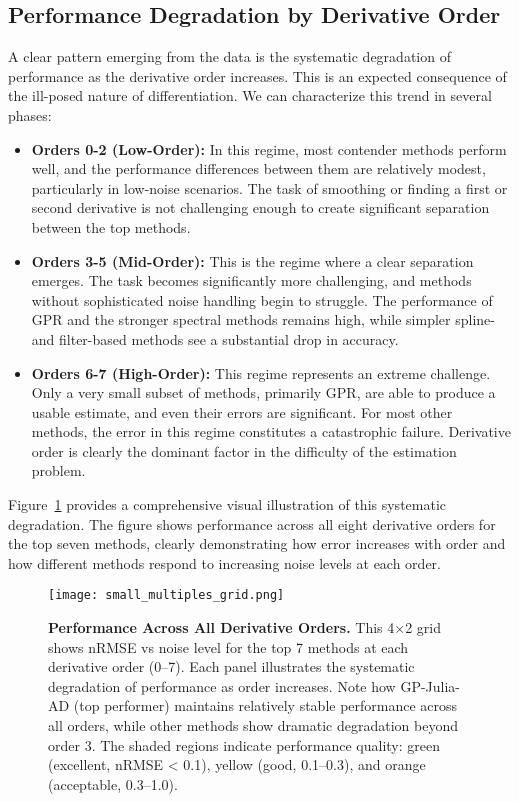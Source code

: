 \subsection{Performance Degradation by Derivative Order}
A clear pattern emerging from the data is the systematic degradation of performance as the derivative order increases. This is an expected consequence of the ill-posed nature of differentiation. We can characterize this trend in several phases:
\begin{itemize}
    \item \textbf{Orders 0-2 (Low-Order):} In this regime, most contender methods perform well, and the performance differences between them are relatively modest, particularly in low-noise scenarios. The task of smoothing or finding a first or second derivative is not challenging enough to create significant separation between the top methods.
    \item \textbf{Orders 3-5 (Mid-Order):} This is the regime where a clear separation emerges. The task becomes significantly more challenging, and methods without sophisticated noise handling begin to struggle. The performance of GPR and the stronger spectral methods remains high, while simpler spline- and filter-based methods see a substantial drop in accuracy.
    \item \textbf{Orders 6-7 (High-Order):} This regime represents an extreme challenge. Only a very small subset of methods, primarily GPR, are able to produce a usable estimate, and even their errors are significant. For most other methods, the error in this regime constitutes a catastrophic failure. Derivative order is clearly the dominant factor in the difficulty of the estimation problem.
\end{itemize}

Figure~\ref{fig:small_multiples} provides a comprehensive visual illustration of this systematic degradation. The figure shows performance across all eight derivative orders for the top seven methods, clearly demonstrating how error increases with order and how different methods respond to increasing noise levels at each order.

\begin{figure}[htbp]
\centering
\texttt{[image: small\_multiples\_grid.png]}
\caption{\textbf{Performance Across All Derivative Orders.} This 4×2 grid shows nRMSE vs noise level for the top 7 methods at each derivative order (0--7). Each panel illustrates the systematic degradation of performance as order increases. Note how GP-Julia-AD (top performer) maintains relatively stable performance across all orders, while other methods show dramatic degradation beyond order 3. The shaded regions indicate performance quality: green (excellent, nRMSE < 0.1), yellow (good, 0.1--0.3), and orange (acceptable, 0.3--1.0).}
\label{fig:small_multiples}
\end{figure}

